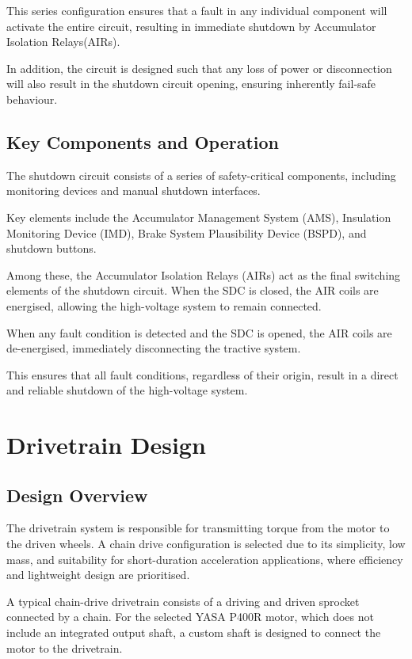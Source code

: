 This series configuration ensures that a fault in any individual component will activate the entire circuit, resulting in immediate shutdown by Accumulator Isolation Relays(AIRs).

In addition, the circuit is designed such that any loss of power or disconnection will also result in the shutdown circuit opening, ensuring inherently fail-safe behaviour.

\subsection{Key Components and Operation}

The shutdown circuit consists of a series of safety-critical components, including monitoring devices and manual shutdown interfaces.

Key elements include the Accumulator Management System (AMS), Insulation Monitoring Device (IMD), Brake System Plausibility Device (BSPD), and shutdown buttons.

Among these, the Accumulator Isolation Relays (AIRs) act as the final switching elements of the shutdown circuit. When the SDC is closed, the AIR coils are energised, allowing the high-voltage system to remain connected.


When any fault condition is detected and the SDC is opened, the AIR coils are de-energised, immediately disconnecting the tractive system.

This ensures that all fault conditions, regardless of their origin, result in a direct and reliable shutdown of the high-voltage system.

\section{Drivetrain Design}

\subsection{Design Overview}

The drivetrain system is responsible for transmitting torque from the motor to the driven wheels. A chain drive configuration is selected due to its simplicity, low mass, and suitability for short-duration acceleration applications, where efficiency and lightweight design are prioritised.

A typical chain-drive drivetrain consists of a driving and driven sprocket connected by a chain. For the selected YASA P400R motor, which does not include an integrated output shaft, a custom shaft is designed to connect the motor to the drivetrain.

